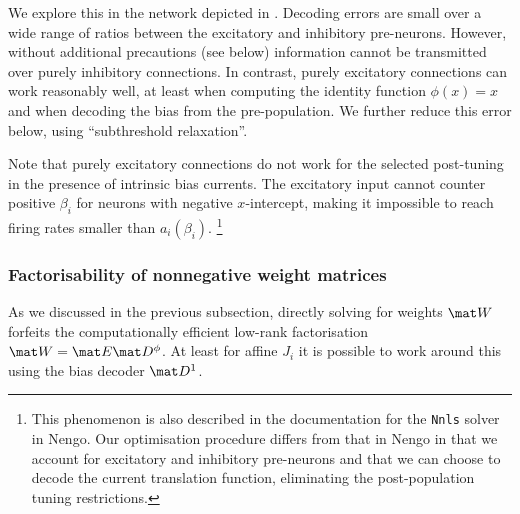We explore this in the network depicted in .
Decoding errors are small over a wide range of ratios between the excitatory and inhibitory pre-neurons.
However, without additional precautions (see below) information cannot be transmitted over purely inhibitory connections.
In contrast, purely excitatory connections can work reasonably well, at least when computing the identity function $\phi(x) = x$ and when decoding the bias from the pre-population.
We further reduce this error below, using \enquote{subthreshold relaxation}.

Note that purely excitatory connections do not work for the selected post-tuning in the presence of intrinsic bias currents.
The excitatory input cannot counter positive $\beta_i$ for neurons with negative $x$-intercept, making it impossible to reach firing rates smaller than $a_i(\beta_i)$.%
\footnote{This phenomenon is also described in the documentation for the \texttt{Nnls} solver in Nengo. 
Our optimisation procedure differs from that in Nengo in that we account for excitatory and inhibitory pre-neurons and that we can choose to decode the current translation function, eliminating the post-population tuning restrictions.}

\subsubsection{Factorisability of nonnegative weight matrices}
As we discussed in the previous subsection, directly solving for weights $\mat W$ forfeits the computationally efficient low-rank factorisation $\mat W = \mat E \mat D^\phi$.
At least for affine $J_i$ it is possible to work around this using the bias decoder $\mat D^1$.

